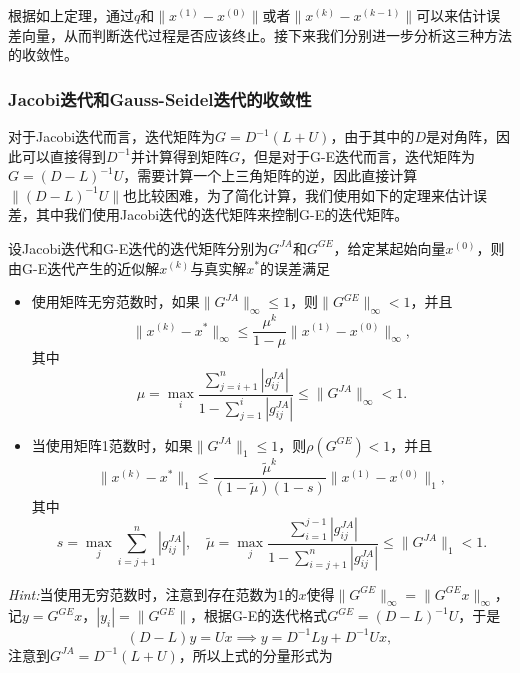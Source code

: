 \documentclass[a4paper,10pt]{ctexart}
\begin{document}
根据如上定理，通过$ q $和$ \| x^{(1)} - x^{(0)} \| $或者$ \| x^{(k)} - x^{(k-1)} \| $可以来估计误差向量，从而判断迭代过程是否应该终止。接下来我们分别进一步分析这三种方法的收敛性。

\subsubsection{Jacobi迭代和Gauss-Seidel迭代的收敛性}
对于Jacobi迭代而言，迭代矩阵为$ G= D^{-1}(L+U) $，由于其中的$ D $是对角阵，因此可以直接得到$ D^{-1} $并计算得到矩阵$ G $，但是对于G-E迭代而言，迭代矩阵为$ G = (D-L)^{-1}U $，需要计算一个上三角矩阵的逆，因此直接计算$ \| (D-L)^{-1}U \| $也比较困难，为了简化计算，我们使用如下的定理来估计误差，其中我们使用Jacobi迭代的迭代矩阵来控制G-E的迭代矩阵。
\begin{theorem}\label{th:theoryerror}
    设Jacobi迭代和G-E迭代的迭代矩阵分别为$ G^{JA} $和$ G^{GE} $，给定某起始向量$ x^{(0)} $，则由G-E迭代产生的近似解$ x^{(k)} $与真实解$ x^* $的误差满足
    \begin{itemize}
        \item 使用矩阵无穷范数时，如果$ \| G^{JA} \|_\infty \leqslant 1 $，则$ \| G^{GE} \|_\infty <1 $，并且
        \begin{equation}
            \| x^{(k)} - x^* \|_\infty \leqslant \frac{\mu^k}{1-\mu} \| x^{(1)} - x^{(0)} \|_\infty,
        \end{equation}
        其中
        \[
            \mu = \max_i \frac{\sum_{j=i+1}^n |g^{JA}_{ij}|}{1-\sum_{j=1}^i |g^{JA}_{ij}|} \leqslant \| G^{JA} \|_\infty<1.
        \]
        \item 当使用矩阵1范数时，如果$ \| G^{JA} \|_1 \leqslant 1 $，则$ \rho(G^{GE}) <1 $，并且
        \begin{equation}
            \| x^{(k)} - x^* \|_1 \leqslant \frac{\tilde{\mu}^k}{(1-\tilde{\mu})(1-s)} \| x^{(1)} - x^{(0)} \|_1,
        \end{equation}
        其中
        \[
            s = \max_j \sum_{i=j+1}^n |g^{JA}_{ij}|,\quad \tilde{\mu} = \max_j \frac{\sum_{i=1}^{j-1} |g^{JA}_{ij}|}{1-\sum_{i=j+1}^n |g^{JA}_{ij}|} \leqslant \| G^{JA} \|_1<1.
        \]
    \end{itemize}
\end{theorem}
\noindent \emph{Hint:}当使用无穷范数时，注意到存在范数为1的$ x $使得$ \| G^{GE} \|_\infty = \| G^{GE}x \|_\infty $，记$ y = G^{GE}x $，$ |y_i| = \| G^{GE} \| $，根据G-E的迭代格式$ G^{GE} = (D-L)^{-1}U $，于是
\[
    (D-L)y = Ux\implies y = D^{-1}L y + D^{-1}U x,
\]
注意到$ G^{JA} = D^{-1}(L+U) $，所以上式的分量形式为
\end{document}
